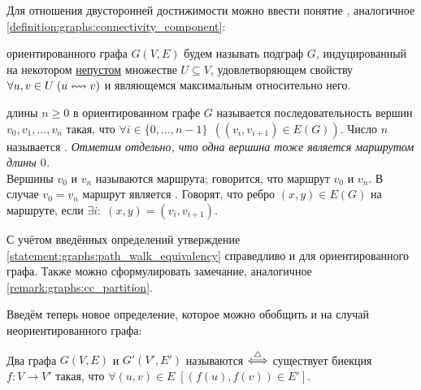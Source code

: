 Для отношения двусторонней достижимости можно ввести понятие , аналогичное \ref{definition:graphs:connectivity_component}:

\begin{definition}
    \label{definition:oriented_graphs:strong_connectivity_component}
     ориентированного графа $ G(V, E) $ будем называть подграф $ G $,
    индуцированный на некотором \underline{непустом} множестве $ U \subseteq V $,
    удовлетворяющем свойству $ \forall u, v \in U \; (u \leftrightsquigarrow v) $ и являющемся максимальным относительно него.
\end{definition}

\begin{definition}
     длины $ n \geqslant 0 $ в ориентированном графе $ G $ называется последовательность вершин $ v_0, v_1, \ldots, v_n $ такая,
    что $ \forall i \in \{ 0, \ldots, n-1 \} \;\, \left( (v_i, v_{i+1}) \in E(G) \right) $.
    \newline
    Число $ n $ называется .
    \newline
    \textit{Отметим отдельно, что одна вершина тоже является маршрутом длины $ 0 $.}
    \\[0.25\baselineskip]
    Вершины $ v_0 $ и $ v_n $ называются  маршрута;
    говорится, что маршрут  $ v_0 $ и $ v_n $.
    В случае $ v_0 = v_n $ маршрут является .
    \newline
    Говорят, что ребро $ (x, y) \in E(G) $  на маршруте, если $ \exists i: \; (x, y) = (v_i, v_{i+1}) $.
\end{definition}

С учётом введённых определений утверждение \ref{statement:graphs:path_walk_equivalency} справедливо и для ориентированного графа.
Также можно сформулировать замечание, аналогичное \ref{remark:graphs:cc_partition}.

Введём теперь новое определение, которое можно обобщить и на случай неориентированного графа:
\begin{definition}
    Два графа $ G(V, E) $ и $ G'(V', E') $ называются  $ \overset{\triangle}{\Longleftrightarrow} $ существует биекция $ f: V \to V' $ такая,
    что $ \forall (u, v) \in E \; \left[ (f(u), f(v)) \in E' \right] $.
\end{definition}
